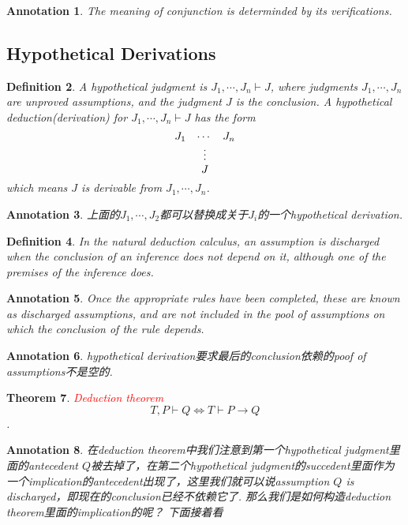 \documentclass{article}
\theoremstyle{plain}
\newtheorem{theorem}{Theorem}
\newtheorem{definition}[theorem]{Definition}
\newtheorem{annotation}[theorem]{Annotation}
\theoremstyle{nonumberplain}
\newcommand{\redt}[1]{\textcolor{red}{#1}}
\begin{document}
\begin{annotation}
\rm The meaning of conjunction is determinded by its \emph{verifications}.  
\end{annotation}

\subsection{Hypothetical Derivations}

\begin{definition}
\rm A \emph{hypothetical judgment} is $J_1, \cdots, J_n \vdash J$, where judgments $J_1,\cdots,J_n$ are unproved assumptions, and the judgment $J$ is the conclusion. A \emph{hypothetical deduction}(derivation) for $J_1, \cdots, J_n \vdash J$ has the form 
$$
\deduce[\vdots]{\raisebox{-1.0em}{$J$}}{J_1 & \cdots & J_n}
$$
which means $J$ is derivable from $J_1, \cdots, J_n$. 
\end{definition}

\begin{annotation}
\rm 上面的$J_1,\cdots,J_2$都可以替换成关于$J_i$的一个hypothetical derivation. 
\end{annotation}


\begin{definition}
\rm In the natural deduction calculus, an assumption is discharged when the conclusion of an inference does not depend on it, although one of the premises of the inference does\cite{tln}.
\end{definition}

\begin{annotation}
\rm Once the appropriate rules have been completed, these are known as discharged assumptions, and are not included in the pool of assumptions on which the conclusion of the rule depends\cite{discharged-proofwiki}.
\end{annotation}

\begin{annotation}
\rm hypothetical derivation要求最后的conclusion依赖的poof of assumptions不是空的. 
\end{annotation}

\begin{theorem}
\rm \redt{Deduction theorem} \[T, P \vdash Q \iff T \vdash P \to Q\].
\end{theorem}

\begin{annotation}
\rm 在deduction theorem中我们注意到第一个hypothetical judgment里面的antecedent $Q$被去掉了，在第二个hypothetical judgment的succedent里面作为一个implication的antecedent出现了，这里我们就可以说assumption $Q$ is discharged，即现在的conclusion已经不依赖它了. 那么我们是如何构造deduction theorem里面的implication的呢？ 下面接着看
\end{annotation}
\end{document}
